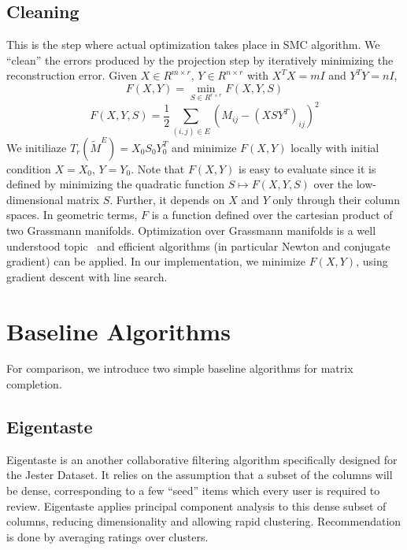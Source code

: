 \documentclass{article} %
\begin{document}
\subsection{Cleaning}
This is the step where actual optimization takes place in SMC algorithm. We
``clean'' the errors produced by the projection step by iteratively
minimizing the reconstruction error. Given $X \in R^{m\times r}$,
$Y \in R^{n\times r}$ with $X^TX = mI$ and $Y^TY = nI$,
\begin{equation}
  F(X,Y) = \min_{S \in R^{r \times r}} F(X,Y,S)
\end{equation}
\begin{equation}
  F(X,Y,S) = \frac{1}{2} \sum\limits_{(i,j) \in E} (M_{ij} - (XSY^T)_{ij})^2
\end{equation}
We initiliaze $T_r(\widetilde{M}^E) = X_0S_0Y_0^T$ and minimize
$F(X, Y)$ locally with initial condition $X = X_0$, $Y = Y_0$. Note
that $F(X, Y)$ is easy to evaluate since it is defined by minimizing
the quadratic function $S \mapsto F(X, Y, S)$ over the low-dimensional
matrix $S$. Further, it depends on $X$ and $Y$ only through their
column spaces. In geometric terms, $F$ is a function defined over the
cartesian product of two Grassmann manifolds. Optimization over
Grassmann manifolds is a well understood
topic~\cite{edelman1998geometry} and efficient algorithms (in
particular Newton and conjugate gradient) can be applied. In our
implementation, we minimize $F(X, Y)$, using gradient descent with
line search.


\section{Baseline Algorithms}

For comparison, we introduce two simple baseline algorithms for matrix
completion.

\subsection{Eigentaste}

Eigentaste \cite{r31} is an another collaborative filtering algorithm specifically
designed for the Jester Dataset. It relies on the assumption that a
subset of the columns will be dense, corresponding to a few ``seed''
items which every user is required to review. Eigentaste applies
principal component analysis to this dense subset of columns, reducing
dimensionality and allowing rapid clustering. Recommendation is done
by averaging ratings over clusters.
\end{document}

